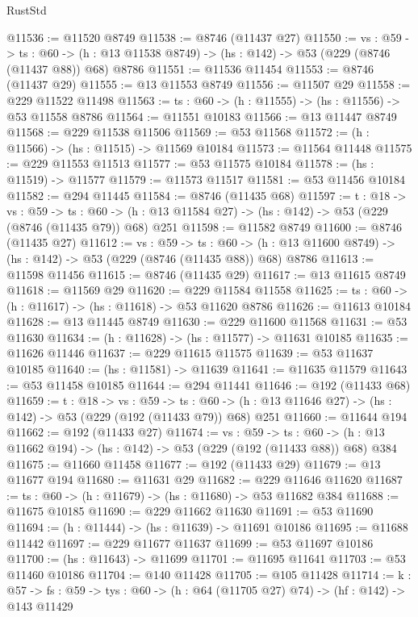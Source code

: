 \begin{lexlean}{RustStd}
\begin{coremodule}
@11536 := @11520 @8749
@11538 := @8746 (@11437 @27)
@11550 := {vs : @59} ->
  {ts : @60} -> (h : @13 @11538 @8749) -> (hs : @142) -> @53 (@229 (@8746 (@11437 @88)) @68) @8786
@11551 := @11536 @11454
@11553 := @8746 (@11437 @29)
@11555 := @13 @11553 @8749
@11556 := @11507 @29
@11558 := @229 @11522 @11498
@11563 := {ts : @60} -> (h : @11555) -> (hs : @11556) -> @53 @11558 @8786
@11564 := @11551 @10183
@11566 := @13 @11447 @8749
@11568 := @229 @11538 @11506
@11569 := @53 @11568
@11572 := (h : @11566) -> (hs : @11515) -> @11569 @10184
@11573 := @11564 @11448
@11575 := @229 @11553 @11513
@11577 := @53 @11575 @10184
@11578 := (hs : @11519) -> @11577
@11579 := @11573 @11517
@11581 := @53 @11456 @10184
@11582 := @294 @11445
@11584 := @8746 (@11435 @68)
@11597 := {t : @18} ->
  {vs : @59} ->
  {ts : @60} -> (h : @13 @11584 @27) -> (hs : @142) -> @53 (@229 (@8746 (@11435 @79)) @68) @251
@11598 := @11582 @8749
@11600 := @8746 (@11435 @27)
@11612 := {vs : @59} ->
  {ts : @60} -> (h : @13 @11600 @8749) -> (hs : @142) -> @53 (@229 (@8746 (@11435 @88)) @68) @8786
@11613 := @11598 @11456
@11615 := @8746 (@11435 @29)
@11617 := @13 @11615 @8749
@11618 := @11569 @29
@11620 := @229 @11584 @11558
@11625 := {ts : @60} -> (h : @11617) -> (hs : @11618) -> @53 @11620 @8786
@11626 := @11613 @10184
@11628 := @13 @11445 @8749
@11630 := @229 @11600 @11568
@11631 := @53 @11630
@11634 := (h : @11628) -> (hs : @11577) -> @11631 @10185
@11635 := @11626 @11446
@11637 := @229 @11615 @11575
@11639 := @53 @11637 @10185
@11640 := (hs : @11581) -> @11639
@11641 := @11635 @11579
@11643 := @53 @11458 @10185
@11644 := @294 @11441
@11646 := @192 (@11433 @68)
@11659 := {t : @18} ->
  {vs : @59} ->
  {ts : @60} -> (h : @13 @11646 @27) -> (hs : @142) -> @53 (@229 (@192 (@11433 @79)) @68) @251
@11660 := @11644 @194
@11662 := @192 (@11433 @27)
@11674 := {vs : @59} ->
  {ts : @60} -> (h : @13 @11662 @194) -> (hs : @142) -> @53 (@229 (@192 (@11433 @88)) @68) @384
@11675 := @11660 @11458
@11677 := @192 (@11433 @29)
@11679 := @13 @11677 @194
@11680 := @11631 @29
@11682 := @229 @11646 @11620
@11687 := {ts : @60} -> (h : @11679) -> (hs : @11680) -> @53 @11682 @384
@11688 := @11675 @10185
@11690 := @229 @11662 @11630
@11691 := @53 @11690
@11694 := (h : @11444) -> (hs : @11639) -> @11691 @10186
@11695 := @11688 @11442
@11697 := @229 @11677 @11637
@11699 := @53 @11697 @10186
@11700 := (hs : @11643) -> @11699
@11701 := @11695 @11641
@11703 := @53 @11460 @10186
@11704 := @140 @11428
@11705 := @105 @11428
@11714 := {k : @57} ->
  {fs : @59} -> {tys : @60} -> (h : @64 (@11705 @27) @74) -> (hf : @142) -> @143 @11429

\end{coremodule}
\end{lexlean}
